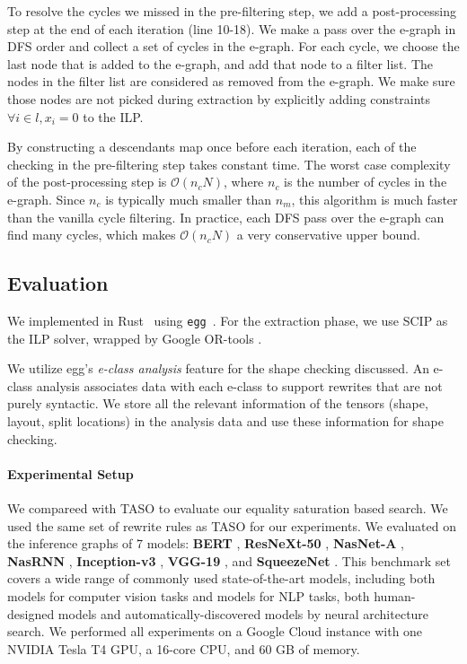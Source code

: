 To resolve the cycles we missed in the pre-filtering step, we add a post-processing step at the end of each iteration (line 10-18).
We make a pass over the e-graph in DFS order and collect a set of cycles in the e-graph.
For each cycle, we choose the last node that is added to the e-graph, and add that node to a filter list.
The nodes in the filter list are considered as removed from the e-graph.
We make sure those nodes are not picked during extraction by explicitly adding constraints $\forall i \in l, x_i = 0$ to the ILP.

By constructing a descendants map once before each iteration, each of the checking in the pre-filtering step takes constant time.
The worst case complexity of the post-processing step is $\mathcal{O}(n_c N)$, where $n_c$ is the number of cycles in the e-graph.
Since $n_c$ is typically much smaller than $n_m$, this algorithm is much faster than the vanilla cycle filtering.
In practice, each DFS pass over the e-graph can find many cycles, which makes $\mathcal{O}(n_c N)$ a very conservative upper bound.

\subsection{Evaluation}

We implemented \ourname{} in Rust~\cite{rust} using \texttt{egg}~\cite{egg}.
For the extraction phase, we use SCIP \cite{scip} as the ILP solver, wrapped by Google OR-tools \cite{ortools}.

We utilize egg's \textit{e-class analysis} feature for the shape checking discussed.
An e-class analysis associates data with each e-class to support rewrites that are not purely syntactic.
We store all the relevant information of the tensors (shape, layout, split locations) in the analysis data and use these information for shape checking.

\paragraph{Experimental Setup}

We compareed \ourname{} with TASO \cite{taso} to evaluate our equality saturation based search.
We used the same set of rewrite rules as TASO for our experiments.
We evaluated on the inference graphs of 7 models:
\textbf{BERT} \cite{bert}, \textbf{ResNeXt-50} \cite{resnext50}, \textbf{NasNet-A} \cite{nasneta}, \textbf{NasRNN} \cite{nasrnn}, \textbf{Inception-v3} \cite{inceptionv3},
\textbf{VGG-19} \cite{vgg}, and \textbf{SqueezeNet} \cite{squeezenet}.
This benchmark set covers a wide range of commonly used state-of-the-art models, including both models for computer vision tasks and models for NLP tasks, both human-designed models and automatically-discovered models by neural architecture search.
We performed all experiments on a Google Cloud instance with one NVIDIA Tesla T4 GPU, a 16-core CPU, and 60 GB of memory.

